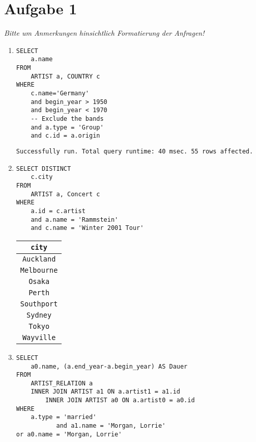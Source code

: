 \documentclass{article}
\begin{document}
    \section*{Aufgabe 1}
    \emph{Bitte um Anmerkungen hinsichtlich Formatierung der Anfragen!}
    \begin{enumerate}
        \item
            \begin{verbatim}
SELECT
    a.name
FROM
    ARTIST a, COUNTRY c
WHERE
    c.name='Germany'
    and begin_year > 1950
    and begin_year < 1970
    -- Exclude the bands
    and a.type = 'Group'
    and c.id = a.origin
            \end{verbatim}
        \texttt{Successfully run. Total query runtime: 40 msec. 55 rows affected.}
        \item
            \begin{verbatim}
SELECT DISTINCT
    c.city
FROM
    ARTIST a, Concert c
WHERE
    a.id = c.artist
    and a.name = 'Rammstein'
    and c.name = 'Winter 2001 Tour'
            \end{verbatim}
            \begin{tabular}{|c|}
                \texttt{city} \\
                \toprule
                \texttt{Auckland} \\
                \texttt{Melbourne} \\
                \texttt{Osaka} \\
                \texttt{Perth} \\
                \texttt{Southport} \\
                \texttt{Sydney} \\
                \texttt{Tokyo} \\
                \texttt{Wayville} \\
            \end{tabular}

        \item
            \begin{verbatim}
SELECT
    a0.name, (a.end_year-a.begin_year) AS Dauer
FROM
    ARTIST_RELATION a
    INNER JOIN ARTIST a1 ON a.artist1 = a1.id
        INNER JOIN ARTIST a0 ON a.artist0 = a0.id
WHERE
    a.type = 'married'
           and a1.name = 'Morgan, Lorrie'
or a0.name = 'Morgan, Lorrie'
            \end{verbatim}


\end{enumerate}
\end{document}
